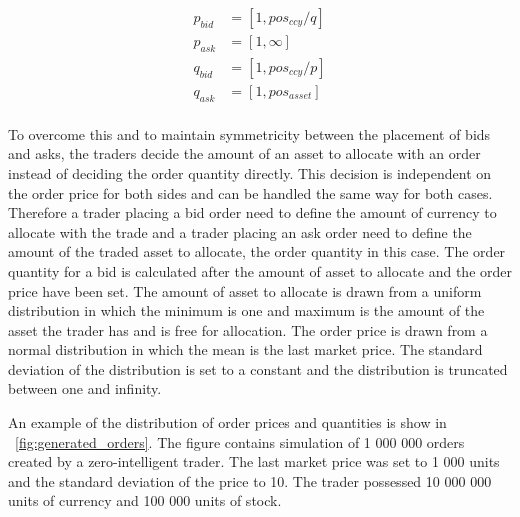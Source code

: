 \begin{equation}
\begin{aligned}
p_{bid} &= \left[1, pos_{ccy} / q \right] \\
p_{ask} &= \left[1, \infty \right] \\
q_{bid} &= \left[1, pos_{ccy} / p\right] \\
q_{ask} &= \left[1, pos_{asset}\right] \\
\end{aligned}
\label{eq:feasible_ranges}
\end{equation}

To overcome this and to maintain symmetricity between the placement of bids and asks, 
the traders decide the amount of an asset to allocate with an order instead of deciding 
the order quantity directly. This decision is independent on the order price for both
sides and can be handled the same way for both cases. Therefore a trader placing a bid order 
need to define the amount of currency to allocate with the trade and a trader placing an ask
order need to define the amount of the traded asset to allocate, the order quantity in this case. 
The order quantity for a bid is calculated after the amount of asset to allocate 
and the order price have been set. The amount of asset to allocate is drawn from a uniform
distribution in which the minimum is one and maximum is the amount of the asset the trader
has and is free for allocation. The order price is drawn from a normal distribution in which 
the mean is the last market price. The standard deviation of the distribution is set to a 
constant and the distribution is truncated between one and infinity.


An example of the distribution of order prices and quantities
is show in ~\ref{fig:generated_orders}. The figure contains simulation
of 1 000 000 orders created by a zero-intelligent trader. 
The last market price was set to 1 000 units and the standard deviation of the price to 10. 
The trader possessed 10 000 000 units of currency and 100 000 
units of stock.


